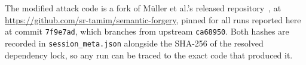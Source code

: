 \documentclass[10pt,twocolumn]{article}
\newcommand{\code}[1]{\texttt{\small #1}}
\begin{document}
The modified attack code is a fork of M\"uller et al.'s released
repository~\cite{semanticforgery-repo}, at\\
\url{https://github.com/sr-tamim/semantic-forgery}, pinned for all runs reported here
at commit \code{7f9e7ad}, which branches from upstream \code{ca68950}. Both hashes
are recorded in \code{session\_meta.json} alongside the SHA-256 of the resolved
dependency lock, so any run can be traced to the exact code that produced it.

\balance


\end{document}
